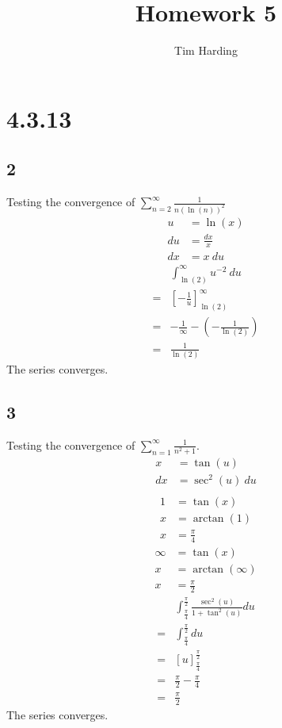\documentclass[12pt]{article}
\title{Homework 5}
\author{Tim Harding}
\newcommand{\round}[1]{\left(       #1 \right)      }
\newcommand{\hard} [1]{\left[       #1 \right]      }
\begin{document}
\maketitle

\section*{4.3.13}

\subsection*{2}
Testing the convergence of $\sum_{n=2}^\infty \frac{1}{n (\ln(n))^2}$
\begin{align*}
    u &= \ln(x) \\
    du &= \frac{dx}{x} \\
    dx &= x\ du
\end{align*}
\begin{align*}
     & \int_{\ln(2)}^\infty u^{-2}\ du \\
    =& \hard{-\frac{1}{u}}_{\ln(2)}^\infty \\
    =& -\frac{1}{\infty} - \round{-\frac{1}{\ln(2)}} \\
    =& \frac{1}{\ln(2)}
\end{align*}
The series converges.



\subsection*{3}
Testing the convergence of $\sum_{n=1}^\infty \frac{1}{n^2 + 1}$.
\begin{align*}
    x &= \tan(u) \\
    dx &= \sec^2(u)\ du \\
\end{align*}
\begin{align*}
    1 &= \tan(x) \\
    x &= \arctan(1) \\
    x &= \frac{\pi}{4}
\end{align*}
\begin{align*}
    \infty &= \tan(x) \\
    x &= \arctan(\infty) \\
    x &= \frac{\pi}{2}
\end{align*}
\begin{align*}
     & \int_\frac{\pi}{4}^\frac{\pi}{2} \frac{\sec^2(u)}{1 + \tan^2(u)} du \\
    =& \int_\frac{\pi}{4}^\frac{\pi}{2} du \\
    =& \hard{u}_{\frac{\pi}{4}}^\frac{\pi}{2} \\
    =& \frac{\pi}{2} - \frac{\pi}{4} \\
    =& \frac{\pi}{2}
\end{align*}
The series converges.
\end{document}
